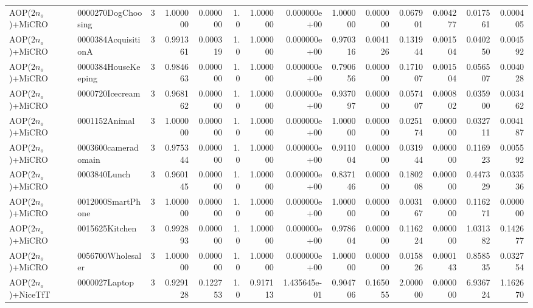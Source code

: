 \begin{tabular}{llrr|r|rr|rr|rr|rrr}
       AOP($2 n_o$)+MiCRO &     0000270DogChoosing &       3 & 1.000000 & 0.000000 &  1.0 &      1.000000 & 0.000000e+00 &      1.000000 & 0.000000 &      0.067901 &    0.004277 &     0.017561 &    0.000405 \\
       AOP($2 n_o$)+MiCRO &    0000384AcquisitionA &       3 & 0.991361 & 0.000319 &  1.0 &      1.000000 & 0.000000e+00 &      0.970316 & 0.004126 &      0.131944 &    0.001504 &     0.040250 &    0.004592 \\
       AOP($2 n_o$)+MiCRO &    0000384HouseKeeping &       3 & 0.984663 & 0.000000 &  1.0 &      1.000000 & 0.000000e+00 &      0.790656 & 0.000000 &      0.171007 &    0.001504 &     0.056507 &    0.004028 \\
       AOP($2 n_o$)+MiCRO &        0000720Icecream &       3 & 0.968162 & 0.000000 &  1.0 &      1.000000 & 0.000000e+00 &      0.937097 & 0.000000 &      0.057407 &    0.000802 &     0.035900 &    0.003462 \\
       AOP($2 n_o$)+MiCRO &          0001152Animal &       3 & 1.000000 & 0.000000 &  1.0 &      1.000000 & 0.000000e+00 &      1.000000 & 0.000000 &      0.025174 &    0.000000 &     0.032711 &    0.004187 \\
       AOP($2 n_o$)+MiCRO &    0003600cameradomain &       3 & 0.975344 & 0.000000 &  1.0 &      1.000000 & 0.000000e+00 &      0.911004 & 0.000000 &      0.031944 &    0.000000 &     0.116923 &    0.005592 \\
       AOP($2 n_o$)+MiCRO &           0003840Lunch &       3 & 0.960145 & 0.000000 &  1.0 &      1.000000 & 0.000000e+00 &      0.837146 & 0.000000 &      0.180208 &    0.000000 &     0.447329 &    0.033536 \\
       AOP($2 n_o$)+MiCRO &      0012000SmartPhone &       3 & 1.000000 & 0.000000 &  1.0 &      1.000000 & 0.000000e+00 &      1.000000 & 0.000000 &      0.003167 &    0.000000 &     0.116271 &    0.000000 \\
       AOP($2 n_o$)+MiCRO &         0015625Kitchen &       3 & 0.992893 & 0.000000 &  1.0 &      1.000000 & 0.000000e+00 &      0.978604 & 0.000000 &      0.116224 &    0.000000 &     1.031382 &    0.142677 \\
       AOP($2 n_o$)+MiCRO &      0056700Wholesaler &       3 & 1.000000 & 0.000000 &  1.0 &      1.000000 & 0.000000e+00 &      1.000000 & 0.000000 &      0.015826 &    0.000143 &     0.858535 &    0.032754 \\
     AOP($2 n_o$)+NiceTfT &          0000027Laptop &       3 & 0.929128 & 0.122753 &  1.0 &      0.917113 & 1.435645e-01 &      0.904706 & 0.165055 &      2.000000 &    0.000000 &     6.936724 &    1.162670 \\

\end{tabular}
